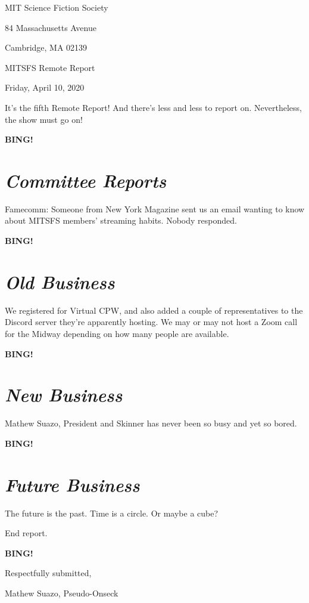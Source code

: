 \documentclass[10pt]{article}
\newcommand{\bing}{{\bf BING!} }
\newcommand{\goto}[1]{\bing \vskip 12pt \section*{{\em{#1}}}}
\newcommand{\skinner}{Mathew Suazo, President and Skinner\xspace}
\newcommand{\onseck}{Mathew Suazo, Pseudo-Onseck\xspace}
\newcommand{\meetingdate}{Friday, April 10, 2020}
\begin{document}
\begin{center}

MIT Science Fiction Society

84 Massachusetts Avenue

Cambridge, MA 02139

\vspace{12pt}

MITSFS Remote Report

\meetingdate

\end{center}

\vspace{18pt}

\setlength{\parskip}{6pt}

\noindent
It's the fifth Remote Report! And there's less and less to report on. Nevertheless, the show must go on!

\goto{Committee Reports}

Famecomm: Someone from New York Magazine sent us an email wanting to know about MITSFS members' streaming habits. Nobody responded.

\goto{Old Business}

We registered for Virtual CPW, and also added a couple of representatives to the Discord server they're apparently hosting. We may or may not host a Zoom call for the Midway depending on how many people are available.

\goto{New Business}

\skinner has never been so busy and yet so bored.

\goto{Future Business}

The future is the past. Time is a circle. Or maybe a cube?

\noindent
End report.

\bing
\vspace{18pt}

\centerline{Respectfully submitted,}
\centerline{\onseck}
\end{document}
